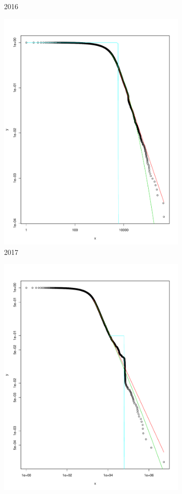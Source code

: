 \documentclass[preprint,12pt]{elsarticle}
\begin{document}
\begin{figure}[H]
\begin{subfigure}{.3\textwidth}
  \caption{2016}
  \label{fig:2016o}
\end{subfigure}
\begin{subfigure}{.3\textwidth}
  \centering
  \includegraphics[width=.8\linewidth]{Bitcoin-graphs/deg-dist-out-2017.pdf}  
  \caption{2017}
  \label{fig:2017o}
\end{subfigure}
\begin{subfigure}{.3\textwidth}
  \centering
  \includegraphics[width=.8\linewidth]{Bitcoin-graphs/deg-dist-out-2018.pdf}  

\end{subfigure}
\end{figure}
\end{document}
